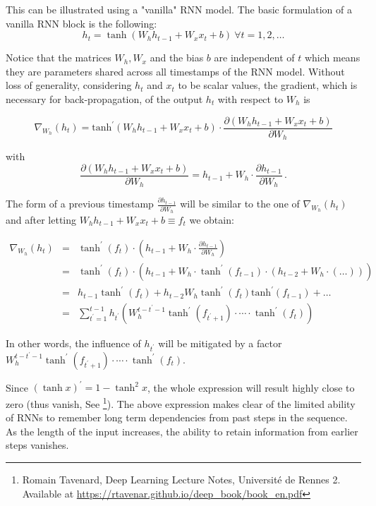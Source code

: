 \documentclass{article}
\begin{document}
\begin{itemize}
\begin{itemize}
		This can be illustrated using a "vanilla" RNN model. The basic formulation of a vanilla RNN block is the following: $$h_t = \tanh (W_h h_{t-1} + W_x x_t + b) ~\forall t=1,2,\ldots$$
	
	    Notice that the matrices $W_h, W_x$ and the bias $b$ are independent of $t$ which means they are parameters shared across all timestamps of the RNN model. Without loss of generality, considering $h_t$ and $x_t$ to be scalar values, the gradient, which is necessary for back-propagation, of the output $h_t$ with respect to $W_h$ is
	        
	    \begin{equation}
	    	\nabla_{W_h}(h_t) = \text{tanh}^\prime(W_h h_{t-1} + W_x x_t + b) \cdot \frac{\partial (W_h h_{t-1} + W_x x_t + b)}{\partial W_h}
	    \end{equation}
    
        with 
	    \begin{equation}
	    	\frac{\partial (W_h h_{t-1} + W_x x_t + b)}{\partial W_h} = h_{t-1} + W_h \cdot \frac{\partial h_{t-1}}{\partial W_h} \, .
	    \end{equation}
	    
	    The form of a previous timestamp $\displaystyle \frac{\partial h_{t-1}}{\partial W_h}$ will be similar to the one of $\nabla_{W_h}(h_t)$ and  after letting $W_h h_{t-1} + W_x x_t + b \equiv f_t$ we obtain:
	    
	    \begin{eqnarray}
	    	\nabla_{W_h}(h_t) &=& \tanh^\prime(f_t) \cdot
	    	\left(
	    	h_{t-1} + W_h \cdot \frac{\partial h_{t-1}}{\partial W_h}
	    	\right) \\
	    	&=& \tanh^\prime(f_t) \cdot
	    	\left(
	    	h_{t-1} + W_h \cdot \tanh^\prime(f_{t-1}) \cdot
	    	\left(
	    	h_{t-2} + W_h \cdot \left( \dots \right)
	    	\right)
	    	\right) \\
	    	&=& h_{t-1} \tanh^\prime(f_t) + h_{t-2} W_h \tanh^\prime(f_t) \text{tanh}^\prime(f_{t-1}) + \dots \\
	    	&=& \sum_{t^\prime = 1}^{t-1} h_{t^\prime} \left( W_h^{t-t^\prime-1} \tanh^\prime(f_{t^\prime+1}) \cdot \cdots \cdot \tanh^\prime(f_{t}) \right)
	    \end{eqnarray}
	    
	    In other words, the influence of $h_{t^\prime}$ will be mitigated by a factor
	    $W_h^{t-t^\prime-1} \tanh^\prime(f_{t^\prime+1}) \cdot \cdots \cdot  \tanh^\prime(f_{t})$. 
	    
	    Since $\left( \tanh x \right)^\prime = 1 - \tanh ^2 x$, the whole expression will result highly close to zero (thus vanish, See \footnote{Romain Tavenard, Deep Learning Lecture Notes, Université de Rennes 2. Available at \url{https://rtavenar.github.io/deep_book/book_en.pdf}}). The above expression makes clear of the limited ability of RNNs to remember long term dependencies from past steps in the sequence. As the length of the input increases, the ability to retain information from earlier steps vanishes.


\end{itemize}
\end{itemize}
\end{document}
